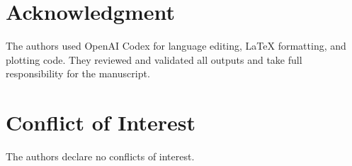 \documentclass[journal,twoside,web]{ieeecolor}
\begin{document}

\section*{Acknowledgment}

The authors used OpenAI Codex for language editing, LaTeX formatting, and plotting code. They reviewed and validated all outputs and take full responsibility for the manuscript.

\section*{Conflict of Interest}

The authors declare no conflicts of interest.
\end{document}
